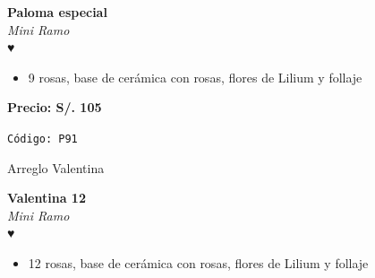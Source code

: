 \documentclass[12pt]{article}
\begin{document}
\hspace{1cm}
\begin{minipage}{0.6\textwidth}
    \textcolor[HTML]{FF8C00}{\textbf{\huge Paloma especial }}\\
    {\textit{Mini Ramo}} \\
    \textcolor[HTML]{FF8C00}{\Huge ♥} \\
    \vspace{0.5cm}
    \begin{itemize}
        \item 9 rosas, base de cerámica con rosas, flores de Lilium y follaje
    \end{itemize}
\end{minipage}
\vspace{0.3cm}
\begin{center}
   \textbf{\Large Precio: \textcolor[HTML]{228B22}{S/. 105 }}
\end{center}
\begin{center}
    \textcolor[HTML]{191970}{\texttt{Código: P91}}
\end{center}
\vspace{1cm}
\newpage
\begin{center}\textcolor[HTML]{191970}{\huge Arreglo Valentina}\end{center}
\noindent
\begin{minipage}{0.6\textwidth}
    \textcolor[HTML]{FF8C00}{\textbf{\huge Valentina 12 }}\\
    {\textit{Mini Ramo}} \\
    \textcolor[HTML]{FF8C00}{\Huge ♥} \\
    \vspace{0.5cm}
    \begin{itemize}
        \item 12 rosas, base de cerámica con rosas, flores de Lilium y follaje
    \end{itemize}
\end{minipage}
\hspace{1cm}
\end{document}

